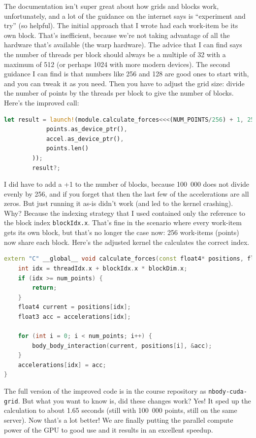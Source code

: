\documentclass[a4paper]{report}
\begin{document}
The documentation isn't super great about how grids and blocks work, unfortunately, and a lot of the guidance on the internet says is ``experiment and try'' (so helpful). The initial approach that I wrote had each work-item be its own block. That's inefficient, because we're not taking advantage of all the hardware that's available (the warp hardware). The advice that I can find says the number of threads per block should always be a multiple of 32 with a maximum of 512 (or perhaps 1024 with more modern devices). The second guidance I can find is that numbers like 256 and 128 are good ones to start with, and you can tweak it as you need. Then you have to adjust the grid size: divide the number of points by the threads per block to give the number of blocks. Here's the improved call:

\begin{lstlisting}[language=Rust]
        let result = launch!(module.calculate_forces<<<(NUM_POINTS/256) + 1, 256, 0, stream>>>(
            points.as_device_ptr(),
            accel.as_device_ptr(),
            points.len()
        ));
        result?;
\end{lstlisting}

I did have to add a +1 to the number of blocks, because 100~000 does not divide evenly by 256, and if you forget that then the last few of the accelerations are all zeros. But just running it as-is didn't work (and led to the kernel crashing). Why? Because the indexing strategy that I used contained only the reference to the block index \texttt{blockIdx.x}. That's fine in the scenario where every work-item gets its own block, but that's no longer the case now: 256 work-items (points) now share each block. Here's the adjusted kernel the calculates the correct index. 

\begin{lstlisting}[language=C++]
extern "C" __global__ void calculate_forces(const float4* positions, float3* accelerations, int num_points) {
    int idx = threadIdx.x + blockIdx.x * blockDim.x;
    if (idx >= num_points) {
        return;
    }
    float4 current = positions[idx];
    float3 acc = accelerations[idx];

    for (int i = 0; i < num_points; i++) {
        body_body_interaction(current, positions[i], &acc);
    }
    accelerations[idx] = acc;
}
\end{lstlisting}

The full version of the improved code is in the course repository as \texttt{nbody-cuda-grid}. But what you want to know is, did these changes work? Yes! It sped up the calculation to about 1.65 seconds (still with 100~000 points, still on the same server). Now that's a lot better! We are finally putting the parallel compute power of the GPU to good use and it results in an excellent speedup.
\end{document}
